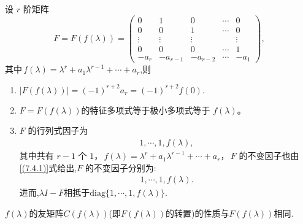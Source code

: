 \documentclass[../../main.tex]{subfiles}
\begin{document}
\begin{lemma}[Frobenius块的基本性质]\label{lemma:Frobenius标准型矩阵的极小多项式和不变因子}
设 $r$ 阶矩阵
\[
F=F(f(\lambda)) = \begin{pmatrix}
0 & 1 & 0 & \cdots & 0 \\
0 & 0 & 1 & \cdots & 0 \\
\vdots & \vdots & \vdots & & \vdots \\
0 & 0 & 0 & \cdots & 1 \\
-a_r & -a_{r - 1} & -a_{r - 2} & \cdots & -a_1
\end{pmatrix},
\]
其中$\,f(\lambda)=\lambda^r + a_1\lambda^{r - 1}+\cdots + a_r$,则
\begin{enumerate}[(1)]
\item $|F(f(\lambda))|=(-1)^{r+2}a_r=(-1)^{r+2}f(0).$

\item $F=F(f(\lambda))$的特征多项式等于极小多项式等于 $f(\lambda)$。

\item $F$ 的行列式因子为
\begin{align}
1,\cdots,1,f(\lambda),\label{(7.4.1)}
\end{align}
其中共有 $r - 1$ 个 $1$，$\,f(\lambda)=\lambda^r + a_1\lambda^{r - 1}+\cdots + a_r$，$\,F$ 的不变因子也由\eqref{(7.4.1)}式给出,$F$ 的不变因子分别为:
\begin{align*}
1,\cdots,1,f(\lambda).
\end{align*}
进而,$\lambda I-F$相抵于$\mathrm{diag}\{1,\cdots,1,f(\lambda)\}.$
\end{enumerate}
\end{lemma}
\begin{remark}
$f(\lambda)$的友矩阵$C(f(\lambda))$(即$F(f(\lambda))$的转置)的性质与$F(f(\lambda))$相同.
\end{remark}
\end{document}
